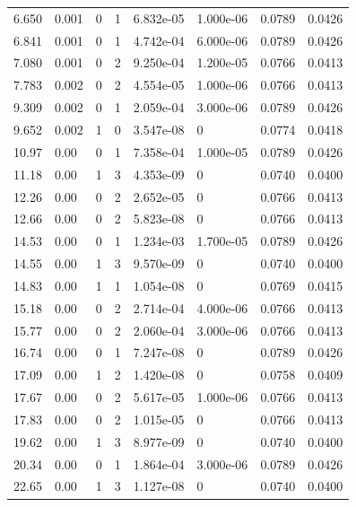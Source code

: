 \documentclass[preview]{standalone}
\begin{document}
{{\begin{tabular}{L{1.2cm}C{1.2cm} C{0.3cm}C{0.5cm} C{1.4cm}C{1.4cm} C{1.4cm}C{1.4cm}}
  6.650  &  0.001  & 0     &  1 &  6.832e-05  & 1.000e-06  & 0.0789 &  0.0426   \\ 
  6.841  &  0.001  & 0     &  1 &  4.742e-04  & 6.000e-06  & 0.0789 &  0.0426   \\ 
  7.080  &  0.001  & 0     &  2 &  9.250e-04  & 1.200e-05  & 0.0766 &  0.0413   \\ 
  7.783  &  0.002  & 0     &  2 &  4.554e-05  & 1.000e-06  & 0.0766 &  0.0413   \\ 
  9.309  &  0.002  & 0     &  1 &  2.059e-04  & 3.000e-06  & 0.0789 &  0.0426   \\ 
  9.652  &  0.002  & 1     &  0 &  3.547e-08  & 0  & 0.0774 &  0.0418   \\ 
  10.97  &  0.00  & 0     &  1 &  7.358e-04  & 1.000e-05  & 0.0789 &  0.0426   \\ 
  11.18  &  0.00  & 1     &  3 &  4.353e-09  & 0  & 0.0740 &  0.0400   \\ 
  12.26  &  0.00  & 0     &  2 &  2.652e-05  & 0  & 0.0766 &  0.0413   \\ 
  12.66  &  0.00  & 0     &  2 &  5.823e-08  & 0  & 0.0766 &  0.0413   \\ 
  14.53  &  0.00  & 0     &  1 &  1.234e-03  & 1.700e-05  & 0.0789 &  0.0426   \\ 
  14.55  &  0.00  & 1     &  3 &  9.570e-09  & 0  & 0.0740 &  0.0400   \\ 
  14.83  &  0.00  & 1     &  1 &  1.054e-08  & 0  & 0.0769 &  0.0415   \\ 
  15.18  &  0.00  & 0     &  2 &  2.714e-04  & 4.000e-06  & 0.0766 &  0.0413   \\ 
  15.77  &  0.00  & 0     &  2 &  2.060e-04  & 3.000e-06  & 0.0766 &  0.0413   \\ 
  16.74  &  0.00  & 0     &  1 &  7.247e-08  & 0  & 0.0789 &  0.0426   \\ 
  17.09  &  0.00  & 1     &  2 &  1.420e-08  & 0  & 0.0758 &  0.0409   \\ 
  17.67  &  0.00  & 0     &  2 &  5.617e-05  & 1.000e-06  & 0.0766 &  0.0413   \\ 
  17.83  &  0.00  & 0     &  2 &  1.015e-05  & 0  & 0.0766 &  0.0413   \\ 
  19.62  &  0.00  & 1     &  3 &  8.977e-09  & 0  & 0.0740 &  0.0400   \\ 
  20.34  &  0.00  & 0     &  1 &  1.864e-04  & 3.000e-06  & 0.0789 &  0.0426   \\ 
  22.65  &  0.00  & 1     &  3 &  1.127e-08  & 0  & 0.0740 &  0.0400   \\ 

\end{tabular}}}
\end{document}
